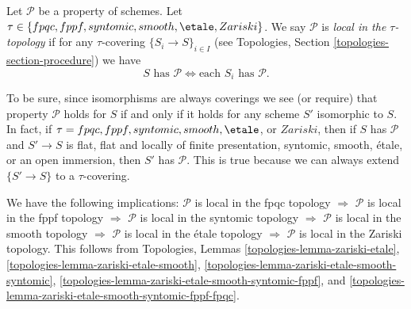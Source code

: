 \begin{definition}
\label{definition-property-local}
Let $\mathcal{P}$ be a property of schemes. Let
$\tau \in \{fpqc, \linebreak[0] fppf, \linebreak[0] syntomic, \linebreak[0]
smooth, \linebreak[0] \etale, \linebreak[0] Zariski\}$.
We say $\mathcal{P}$ is {\it local in the $\tau$-topology} if for any
$\tau$-covering $\{S_i \to S\}_{i \in I}$ (see
Topologies, Section \ref{topologies-section-procedure})
we have
$$
S \text{ has }\mathcal{P}
\Leftrightarrow
\text{each }S_i \text{ has }\mathcal{P}.
$$
\end{definition}

\noindent
To be sure, since isomorphisms are always coverings
we see (or require) that property $\mathcal{P}$ holds for $S$
if and only if it holds for any scheme $S'$ isomorphic to $S$.
In fact, if $\tau = fpqc, \linebreak[0] fppf, \linebreak[0] syntomic,
\linebreak[0] smooth, \linebreak[0] \etale$, or $Zariski$, then
if $S$ has $\mathcal{P}$ and $S' \to S$ is
flat, flat and locally of finite presentation, syntomic, smooth, \'etale, or
an open immersion, then $S'$ has $\mathcal{P}$. This is true because
we can always extend $\{S' \to S\}$ to a $\tau$-covering.

\medskip\noindent
We have the following implications:
$\mathcal{P}$ is local in the fpqc topology
$\Rightarrow$
$\mathcal{P}$ is local in the fppf topology
$\Rightarrow$
$\mathcal{P}$ is local in the syntomic topology
$\Rightarrow$
$\mathcal{P}$ is local in the smooth topology
$\Rightarrow$
$\mathcal{P}$ is local in the \'etale topology
$\Rightarrow$
$\mathcal{P}$ is local in the Zariski topology.
This follows from
Topologies, Lemmas
\ref{topologies-lemma-zariski-etale},
\ref{topologies-lemma-zariski-etale-smooth},
\ref{topologies-lemma-zariski-etale-smooth-syntomic},
\ref{topologies-lemma-zariski-etale-smooth-syntomic-fppf}, and
\ref{topologies-lemma-zariski-etale-smooth-syntomic-fppf-fpqc}.

